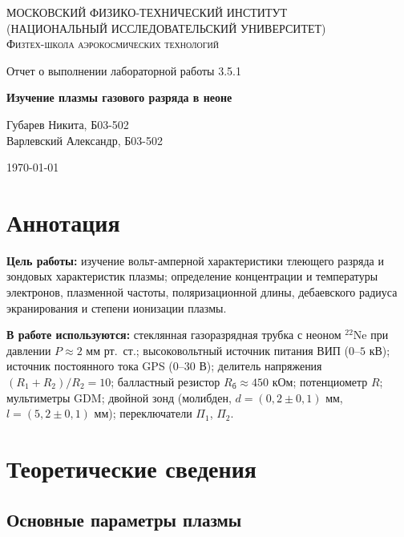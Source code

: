 \documentclass[a4paper]{article}
\begin{document}
	
	\begin{titlepage}
		\centering
		{\scshape\Large МОСКОВСКИЙ ФИЗИКО-ТЕХНИЧЕСКИЙ ИНСТИТУТ \\
			(НАЦИОНАЛЬНЫЙ ИССЛЕДОВАТЕЛЬСКИЙ УНИВЕРСИТЕТ)\\
			Физтех-школа аэрокосмических технологий}
		
		\vspace{4cm}
		{\LARGE Отчет о выполнении лабораторной работы 3.5.1}
		\vspace{1cm}
		
		{\huge\bf Изучение плазмы газового разряда в неоне}
		
		\vspace{1cm}
		\vfill
		
		\begin{flushright}
			{\LARGE Губарев Никита, Б03-502} \\
			{\LARGE Варлевский Александр, Б03-502}
		\end{flushright}
		\vfill 
		\today
	\end{titlepage}
	
	\tableofcontents
	
	\section{Аннотация}
	
	\textbf{Цель работы:} изучение вольт-амперной характеристики тлеющего разряда и зондовых характеристик плазмы; определение концентрации и температуры электронов, плазменной частоты, поляризационной длины, дебаевского радиуса экранирования и степени ионизации плазмы.
	
	\textbf{В работе используются:} стеклянная газоразрядная трубка с неоном $^{22}$Ne при давлении $P \approx 2$ мм рт.~ст.; высоковольтный источник питания ВИП ($0$--$5$ кВ); источник постоянного тока GPS ($0$--$30$ В); делитель напряжения $(R_1+R_2)/R_2 = 10$; балластный резистор $R_б \approx 450$ кОм; потенциометр $R$; мультиметры GDM; двойной зонд (молибден, $d = (0{,}2 \pm 0{,}1)$ мм, $l = (5{,}2 \pm 0{,}1)$ мм); переключатели $\Pi_1$, $\Pi_2$.
	
	\section{Теоретические сведения}
	
	\subsection{Основные параметры плазмы}
	
\end{document}
